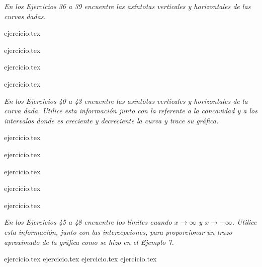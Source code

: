 \vspace{1em}
\noindent \textit{En los Ejercicios 36 a 39 encuentre las asíntotas verticales y horizontales de las curvas dadas.}

\begin{enumerate}
    \setcounter{enumi}{35}
    \begin{minipage}{0.45\textwidth}
    {ejercicio.tex}
    \addtocounter{enumi}{1}
    {ejercicio.tex}
    \end{minipage}%
    \begin{minipage}{0.45\textwidth}
    \setcounter{enumi}{36}
    {ejercicio.tex}
    \addtocounter{enumi}{1}
    {ejercicio.tex}
    \end{minipage}
\end{enumerate}

\vspace{1em}
\noindent \textit{En los Ejercicios 40 a 43 encuentre las asíntotas verticales y horizontales de la curva dada. Utilice esta información junto con la referente a la concavidad y a los intervalos donde es creciente y decreciente la curva y trace su gráfica.}

\begin{enumerate}
    \setcounter{enumi}{39}
    \begin{minipage}{0.45\textwidth}
    {ejercicio.tex}
    \addtocounter{enumi}{1}
    {ejercicio.tex}
    \end{minipage}%
    \begin{minipage}{0.45\textwidth}
    \setcounter{enumi}{40}
    {ejercicio.tex}
    \addtocounter{enumi}{1}
    {ejercicio.tex}
    \end{minipage}
\end{enumerate}

\vspace{1em}
\begin{enumerate}
    \setcounter{enumi}{43}
    {ejercicio.tex}
\end{enumerate}

\noindent \textit{En los Ejercicios 45 a 48 encuentre los límites cuando $x \to \infty$ y $x \to -\infty$. Utilice esta información, junto con las intercepciones, para proporcionar un trazo aproximado de la gráfica como se hizo en el Ejemplo 7.}

\begin{enumerate}
    \setcounter{enumi}{44}
    {ejercicio.tex}
    {ejercicio.tex}
    {ejercicio.tex}
    {ejercicio.tex}
\end{enumerate}

